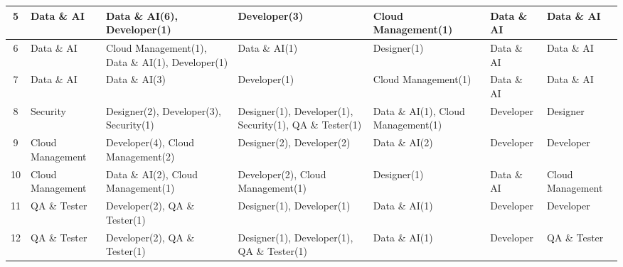 \begin{table}[H]
\begin{tabularx}{\textwidth}{|c|>{\raggedright\arraybackslash}X|>{\raggedright\arraybackslash}X|>{\raggedright\arraybackslash}X|>{\raggedright\arraybackslash}X|>{\raggedright\arraybackslash}X|>{\raggedright\arraybackslash}X|}
        5                     & Data \& AI                     & Data \& AI(6), Developer(1)                      & Developer(3)                                              & Cloud Management(1)                & Data \& AI                       & Data \& AI                             \\ \hline
        6                     & Data \& AI                     & Cloud Management(1), Data \& AI(1), Developer(1) & Data \& AI(1)                                             & Designer(1)                        & Data \& AI                       & Data \& AI                             \\ \hline
        7                     & Data \& AI                     & Data \& AI(3)                                    & Developer(1)                                              & Cloud Management(1)                & Data \& AI                       & Data \& AI                             \\ \hline
        8                     & Security                       & Designer(2), Developer(3), Security(1)           & Designer(1), Developer(1), Security(1), \newline QA \& Tester(1)   & Data \& AI(1), Cloud Management(1) & {\cellcolor[gray]{.9}}Developer  & {\cellcolor[gray]{.9}}Designer         \\ \hline
        9                     & Cloud Management               & Developer(4), Cloud Management(2)                & Designer(2), Developer(2)                                 & Data \& AI(2)                      & Developer                        & Developer                              \\ \hline
        10                    & Cloud Management               & Data \& AI(2), Cloud Management(1)               & Developer(2), Cloud Management(1)                         & Designer(1)                        & {\cellcolor[gray]{.9}}Data \& AI & {\cellcolor[gray]{.9}}Cloud Management \\ \hline
        11                    & QA \& Tester                   & Developer(2), QA \& Tester(1)                    & Designer(1), Developer(1)                                 & Data \& AI(1)                      & Developer                        & Developer                              \\ \hline
        12                    & QA \& Tester                   & Developer(2), QA \& Tester(1)                    & Designer(1), Developer(1), QA \& Tester(1)                & Data \& AI(1)                      & {\cellcolor[gray]{.9}}Developer  & {\cellcolor[gray]{.9}}QA \& Tester     \\ \hline

\end{tabularx}
\end{table}
